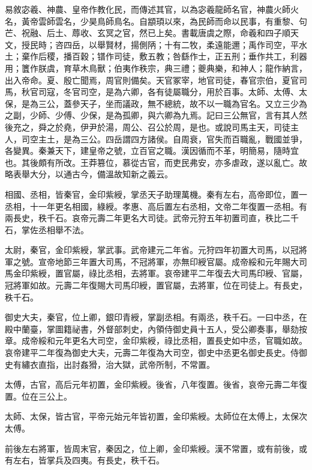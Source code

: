 
\begin{pinyinscope}
易敘宓羲、神農、皇帝作教化民，而傳述其官，以為宓羲龍師名官，神農火師火名，黃帝雲師雲名，少昊鳥師鳥名。自顓頊以來，為民師而命以民事，有重黎、句芒、祝融、后土、蓐收、玄冥之官，然已上矣。書載唐虞之際，命羲和四子順天文，授民時；咨四岳，以舉賢材，揚側陃；十有二牧，柔遠能邇；禹作司空，平水土；棄作后稷，播百穀；镨作司徒，敷五教；咎繇作士，正五刑；垂作共工，利器用；籄作朕虞，育草木鳥獸；伯夷作秩宗，典三禮；夔典樂，和神人；龍作納言，出入帝命。夏、殷亡聞焉，周官則備矣。天官冢宰，地官司徒，春官宗伯，夏官司馬，秋官司寇，冬官司空，是為六卿，各有徒屬職分，用於百事。太師、太傅、太保，是為三公，蓋參天子，坐而議政，無不總統，故不以一職為官名。又立三少為之副，少師、少傅、少保，是為孤卿，與六卿為九焉。記曰三公無官，言有其人然後充之，舜之於堯，伊尹於湯，周公、召公於周，是也。或說司馬主天，司徒主人，司空主土，是為三公。四岳謂四方諸侯。自周衰，官失而百職亂，戰國並爭，各變異。秦兼天下，建皇帝之號，立百官之職。漢因循而不革，明簡易，隨時宜也。其後頗有所改。王莽篡位，慕從古官，而吏民弗安，亦多虐政，遂以亂亡。故略表舉大分，以通古今，備溫故知新之義云。

相國、丞相，皆秦官，金印紫綬，掌丞天子助理萬機。秦有左右，高帝即位，置一丞相，十一年更名相國，綠綬。孝惠、高后置左右丞相，文帝二年復置一丞相。有兩長史，秩千石。哀帝元壽二年更名大司徒。武帝元狩五年初置司直，秩比二千石，掌佐丞相舉不法。

太尉，秦官，金印紫綬，掌武事。武帝建元二年省。元狩四年初置大司馬，以冠將軍之號。宣帝地節三年置大司馬，不冠將軍，亦無印綬官屬。成帝綏和元年賜大司馬金印紫綬，置官屬，祿比丞相，去將軍。哀帝建平二年復去大司馬印綬、官屬，冠將軍如故。元壽二年復賜大司馬印綬，置官屬，去將軍，位在司徒上。有長史，秩千石。

御史大夫，秦官，位上卿，銀印青綬，掌副丞相。有兩丞，秩千石。一曰中丞，在殿中蘭臺，掌圖籍祕書，外督部刺史，內領侍御史員十五人，受公卿奏事，舉劾按章。成帝綏和元年更名大司空，金印紫綬，祿比丞相，置長史如中丞，官職如故。哀帝建平二年復為御史大夫，元壽二年復為大司空，御史中丞更名御史長史。侍御史有繡衣直指，出討姦猾，治大獄，武帝所制，不常置。

太傅，古官，高后元年初置，金印紫綬。後省，八年復置。後省，哀帝元壽二年復置。位在三公上。

太師、太保，皆古官，平帝元始元年皆初置，金印紫綬。太師位在太傅上，太保次太傅。

前後左右將軍，皆周末官，秦因之，位上卿，金印紫綬。漢不常置，或有前後，或有左右，皆掌兵及四夷。有長史，秩千石。


\end{pinyinscope}
